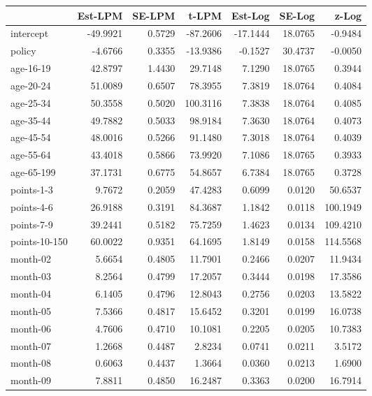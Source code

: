 \documentclass[10pt]{article}
\begin{document}
\begin{table}[ht]
\centering
\begin{tabular}{lrrrrrr}
  \hline
 & Est-LPM & SE-LPM & t-LPM & Est-Log & SE-Log & z-Log \\ 
  \hline
intercept & -49.9921 & 0.5729 & -87.2606 & -17.1444 & 18.0765 & -0.9484 \\ 
  policy & -4.6766 & 0.3355 & -13.9386 & -0.1527 & 30.4737 & -0.0050 \\ 
  age-16-19 & 42.8797 & 1.4430 & 29.7148 & 7.1290 & 18.0765 & 0.3944 \\ 
  age-20-24 & 51.0089 & 0.6507 & 78.3955 & 7.3819 & 18.0764 & 0.4084 \\ 
  age-25-34 & 50.3558 & 0.5020 & 100.3116 & 7.3838 & 18.0764 & 0.4085 \\ 
  age-35-44 & 49.7882 & 0.5033 & 98.9184 & 7.3630 & 18.0764 & 0.4073 \\ 
  age-45-54 & 48.0016 & 0.5266 & 91.1480 & 7.3018 & 18.0764 & 0.4039 \\ 
  age-55-64 & 43.4018 & 0.5866 & 73.9920 & 7.1086 & 18.0765 & 0.3933 \\ 
  age-65-199 & 37.1731 & 0.6775 & 54.8657 & 6.7384 & 18.0765 & 0.3728 \\ 
  points-1-3 & 9.7672 & 0.2059 & 47.4283 & 0.6099 & 0.0120 & 50.6537 \\ 
  points-4-6 & 26.9188 & 0.3191 & 84.3687 & 1.1842 & 0.0118 & 100.1949 \\ 
  points-7-9 & 39.2441 & 0.5182 & 75.7259 & 1.4623 & 0.0134 & 109.4210 \\ 
  points-10-150 & 60.0022 & 0.9351 & 64.1695 & 1.8149 & 0.0158 & 114.5568 \\ 
  month-02 & 5.6654 & 0.4805 & 11.7901 & 0.2466 & 0.0207 & 11.9434 \\ 
  month-03 & 8.2564 & 0.4799 & 17.2057 & 0.3444 & 0.0198 & 17.3586 \\ 
  month-04 & 6.1405 & 0.4796 & 12.8043 & 0.2756 & 0.0203 & 13.5822 \\ 
  month-05 & 7.5366 & 0.4817 & 15.6452 & 0.3201 & 0.0199 & 16.0738 \\ 
  month-06 & 4.7606 & 0.4710 & 10.1081 & 0.2205 & 0.0205 & 10.7383 \\ 
  month-07 & 1.2668 & 0.4487 & 2.8234 & 0.0741 & 0.0211 & 3.5172 \\ 
  month-08 & 0.6063 & 0.4437 & 1.3664 & 0.0360 & 0.0213 & 1.6900 \\ 
  month-09 & 7.8811 & 0.4850 & 16.2487 & 0.3363 & 0.0200 & 16.7914 \\ 

\end{tabular}
\end{table}
\end{document}

